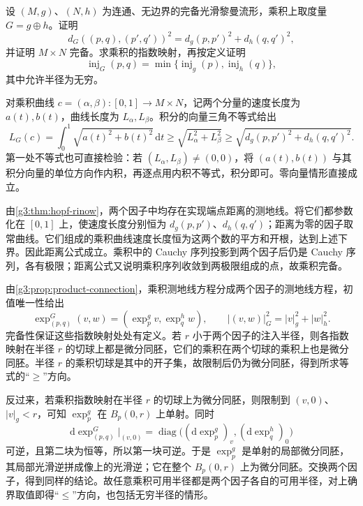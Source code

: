\begin{exercise}\label{g3:ex:complete-product-distance-injectivity}
	设 \((M,g)\)、\((N,h)\) 为连通、无边界的完备光滑黎曼流形，乘积上取度量 \(G=g\oplus h\)。证明
	\[
		d_G((p,q),(p',q'))^2=d_g(p,p')^2+d_h(q,q')^2,
	\]
	并证明 \(M\times N\) 完备。求乘积的指数映射，再按定义证明
	\[
		\operatorname{inj}_G(p,q)
		=\min\{\operatorname{inj}_g(p),\operatorname{inj}_h(q)\},
	\]
	其中允许半径为无穷。
\end{exercise}
\begin{solution}
	对乘积曲线 \(c=(\alpha,\beta):[0,1]\to M\times N\)，记两个分量的速度长度为 \(a(t),b(t)\)，曲线长度为 \(L_\alpha,L_\beta\)。积分的向量三角不等式给出
	\[
		L_G(c)=\int_0^1\sqrt{a(t)^2+b(t)^2}\,\mathrm{d}t
		\ge\sqrt{L_\alpha^2+L_\beta^2}
		\ge\sqrt{d_g(p,p')^2+d_h(q,q')^2}.
	\]
	第一处不等式也可直接检验：若 \((L_\alpha,L_\beta)\ne(0,0)\)，将 \((a(t),b(t))\) 与其积分向量的单位方向作内积，再逐点用内积不等式，积分即可。零向量情形直接成立。

	由\cref{g3:thm:hopf-rinow}，两个因子中均存在实现端点距离的测地线。将它们都参数化在 \([0,1]\) 上，使速度长度分别恒为 \(d_g(p,p')\)、\(d_h(q,q')\)；距离为零的因子取常曲线。它们组成的乘积曲线速度长度恒为这两个数的平方和开根，达到上述下界。因此距离公式成立。乘积中的 Cauchy 序列投影到两个因子后仍是 Cauchy 序列，各有极限；距离公式又说明乘积序列收敛到两极限组成的点，故乘积完备。

	由\cref{g3:prop:product-connection}，乘积测地线方程分成两个因子的测地线方程，初值唯一性给出
	\[
		\exp^G_{(p,q)}(v,w)
		=(\exp^g_pv,\exp^h_qw),\qquad
		|(v,w)|_G^2=|v|_g^2+|w|_h^2.
	\]
	完备性保证这些指数映射处处有定义。若 \(r\) 小于两个因子的注入半径，则各指数映射在半径 \(r\) 的切球上都是微分同胚，它们的乘积在两个切球的乘积上也是微分同胚。半径 \(r\) 的乘积切球是其中的开子集，故限制后仍为微分同胚，得到所求等式的“\(\ge\)”方向。

	反过来，若乘积指数映射在半径 \(r\) 的切球上为微分同胚，则限制到 \((v,0)\)、\(|v|_g<r\)，可知 \(\exp_p^g\) 在 \(B_p(0,r)\) 上单射。同时
	\[
		\mathrm{d}\exp^G_{(p,q)}\big|_{(v,0)}
		=\operatorname{diag}\bigl((\mathrm{d}\exp^g_p)_v,
			(\mathrm{d}\exp^h_q)_0\bigr)
	\]
	可逆，且第二块为恒等，所以第一块可逆。于是 \(\exp_p^g\) 是单射的局部微分同胚，其局部光滑逆拼成像上的光滑逆；它在整个 \(B_p(0,r)\) 上为微分同胚。交换两个因子，得到同样的结论。故任意乘积可用半径都是两个因子各自的可用半径，对上确界取值即得“\(\le\)”方向，也包括无穷半径的情形。
\end{solution}

